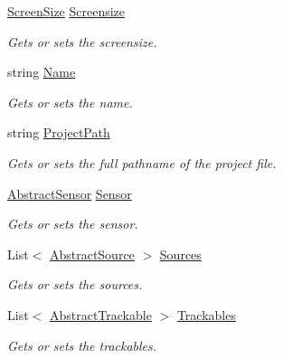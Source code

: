 \begin{DoxyCompactItemize}
\item 
\hyperlink{class_a_rdev_kit_1_1_model_1_1_project_1_1_screen_size}{Screen\-Size} \hyperlink{class_a_rdev_kit_1_1_model_1_1_project_1_1_project_afe6b2e85505c01075fbc52a0cc851ce9}{Screensize}
\begin{DoxyCompactList}\small\item\em Gets or sets the screensize. \end{DoxyCompactList}\item 
string \hyperlink{class_a_rdev_kit_1_1_model_1_1_project_1_1_project_ae52006b6ebb8293ff034e8e00fdc4e77}{Name}
\begin{DoxyCompactList}\small\item\em Gets or sets the name. \end{DoxyCompactList}\item 
string \hyperlink{class_a_rdev_kit_1_1_model_1_1_project_1_1_project_ad1061c35bc3ffb4caefebce4f22c365c}{Project\-Path}
\begin{DoxyCompactList}\small\item\em Gets or sets the full pathname of the project file. \end{DoxyCompactList}\item 
\hyperlink{class_a_rdev_kit_1_1_model_1_1_project_1_1_abstract_sensor}{Abstract\-Sensor} \hyperlink{class_a_rdev_kit_1_1_model_1_1_project_1_1_project_ac22f350013113d1e85605346d824cbc1}{Sensor}
\begin{DoxyCompactList}\small\item\em Gets or sets the sensor. \end{DoxyCompactList}\item 
List$<$ \hyperlink{class_a_rdev_kit_1_1_model_1_1_project_1_1_abstract_source}{Abstract\-Source} $>$ \hyperlink{class_a_rdev_kit_1_1_model_1_1_project_1_1_project_ade6d1eebeab2acee826e2ddf22724fb5}{Sources}
\begin{DoxyCompactList}\small\item\em Gets or sets the sources. \end{DoxyCompactList}\item 
List$<$ \hyperlink{class_a_rdev_kit_1_1_model_1_1_project_1_1_abstract_trackable}{Abstract\-Trackable} $>$ \hyperlink{class_a_rdev_kit_1_1_model_1_1_project_1_1_project_af3d7540cfeabb22ce7290378d7039a76}{Trackables}
\begin{DoxyCompactList}\small\item\em Gets or sets the trackables. \end{DoxyCompactList}\end{DoxyCompactItemize}


